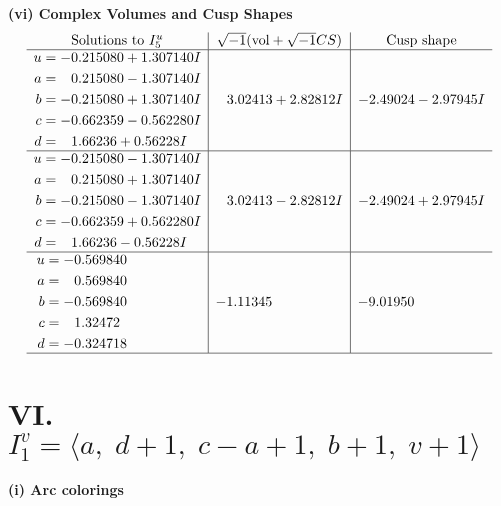 \documentclass[1p]{elsarticle_modified}
\theoremstyle{definition}
\newcommand{\I}{\sqrt{-1}}
\begin{document}
\newpage\flushleft \textbf{(vi) Complex Volumes and Cusp Shapes}
$$\begin{array}{c|c|c}  
\text{Solutions to }I^u_{5}& \I (\text{vol} + \sqrt{-1}CS) & \text{Cusp shape}\\
 \hline 
\begin{aligned}
u &= -0.215080 + 1.307140 I \\
a &= \phantom{-}0.215080 - 1.307140 I \\
b &= -0.215080 + 1.307140 I \\
c &= -0.662359 - 0.562280 I \\
d &= \phantom{-}1.66236 + 0.56228 I\end{aligned}
 & \phantom{-}3.02413 + 2.82812 I & -2.49024 - 2.97945 I \\ \hline\begin{aligned}
u &= -0.215080 - 1.307140 I \\
a &= \phantom{-}0.215080 + 1.307140 I \\
b &= -0.215080 - 1.307140 I \\
c &= -0.662359 + 0.562280 I \\
d &= \phantom{-}1.66236 - 0.56228 I\end{aligned}
 & \phantom{-}3.02413 - 2.82812 I & -2.49024 + 2.97945 I \\ \hline\begin{aligned}
u &= -0.569840\phantom{ +0.000000I} \\
a &= \phantom{-}0.569840\phantom{ +0.000000I} \\
b &= -0.569840\phantom{ +0.000000I} \\
c &= \phantom{-}1.32472\phantom{ +0.000000I} \\
d &= -0.324718\phantom{ +0.000000I}\end{aligned}
 & -1.11345\phantom{ +0.000000I} & -9.01950\phantom{ +0.000000I}\\
 \hline 
 \end{array}$$\newpage\newpage\renewcommand{\arraystretch}{1}
\centering \section*{VI. $I^v_{1}= \langle a,\;d+1,\;c- a+1,\;b+1,\;v+1 \rangle$}
\flushleft \textbf{(i) Arc colorings}\\
\end{document}
